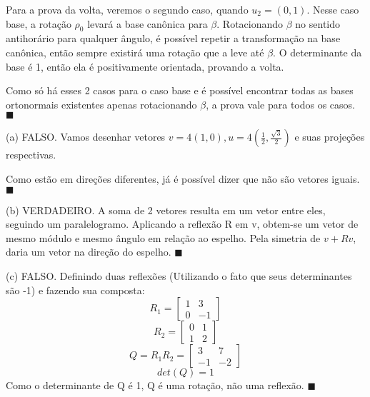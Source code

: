 \documentclass{homework}
\begin{document}
Para a prova da volta, veremos o segundo caso, quando $u_2 = (0,1)$. Nesse caso base, a rotação $\rho_0$ levará a base canônica para $\beta$. Rotacionando $\beta$ no sentido antihorário para qualquer ângulo, é possível repetir a transformação na base canônica, então sempre existirá uma rotação que a leve até $\beta$. O determinante da base é 1, então ela é positivamente orientada, provando a volta.

Como só há esses 2 casos para o caso base e é possível encontrar todas as bases ortonormais existentes apenas rotacionando $\beta$, a prova vale para todos os casos. $\blacksquare$ 

\exercise
(a) FALSO. Vamos desenhar vetores $v = 4(1,0), u = 4(\frac{1}{2},\frac{\sqrt{3}}{2})$ e suas projeções respectivas.

\begin{center}
\end{center}

Como estão em direções diferentes, já é possível dizer que não são vetores iguais. $\blacksquare$

(b) VERDADEIRO. A soma de 2 vetores resulta em um vetor entre eles, seguindo um paralelogramo. Aplicando a reflexão R em v, obtem-se um vetor de mesmo módulo e mesmo ângulo em relação ao espelho. Pela simetria de $v + Rv$, daria um vetor na direção do espelho. $\blacksquare$

(c) FALSO. Definindo duas reflexões (Utilizando o fato que seus determinantes são -1) e fazendo sua composta:
\[R_1 = 
\begin{bmatrix}
1 & 3\\
0 & -1
\end{bmatrix}\]
\[R_2 =
\begin{bmatrix}
0 & 1\\
1 & 2
\end{bmatrix}\]
\[Q = R_1 R_2 = 
\begin{bmatrix}
3 & 7\\
-1 & -2
\end{bmatrix}\]
\[det(Q) = 1\]
Como o determinante de Q é 1, Q é uma rotação, não uma reflexão. $\blacksquare$
\end{document}
